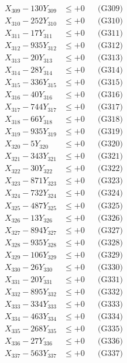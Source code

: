 \documentclass[a4paper,10pt]{article}
\begin{document}
{\begin{align}
X_{309} - 130Y_{309} &\leq +0 && \text{(G309)} \\
X_{310} - 252Y_{310} &\leq +0 && \text{(G310)} \\
\allowbreak
X_{311} - 17Y_{311} &\leq +0 && \text{(G311)} \\
X_{312} - 935Y_{312} &\leq +0 && \text{(G312)} \\
X_{313} - 20Y_{313} &\leq +0 && \text{(G313)} \\
X_{314} - 28Y_{314} &\leq +0 && \text{(G314)} \\
X_{315} - 336Y_{315} &\leq +0 && \text{(G315)} \\
X_{316} - 40Y_{316} &\leq +0 && \text{(G316)} \\
X_{317} - 744Y_{317} &\leq +0 && \text{(G317)} \\
X_{318} - 66Y_{318} &\leq +0 && \text{(G318)} \\
X_{319} - 935Y_{319} &\leq +0 && \text{(G319)} \\
X_{320} - 5Y_{320} &\leq +0 && \text{(G320)} \\
\allowbreak
X_{321} - 343Y_{321} &\leq +0 && \text{(G321)} \\
X_{322} - 30Y_{322} &\leq +0 && \text{(G322)} \\
X_{323} - 871Y_{323} &\leq +0 && \text{(G323)} \\
X_{324} - 732Y_{324} &\leq +0 && \text{(G324)} \\
X_{325} - 487Y_{325} &\leq +0 && \text{(G325)} \\
X_{326} - 13Y_{326} &\leq +0 && \text{(G326)} \\
X_{327} - 894Y_{327} &\leq +0 && \text{(G327)} \\
X_{328} - 935Y_{328} &\leq +0 && \text{(G328)} \\
X_{329} - 106Y_{329} &\leq +0 && \text{(G329)} \\
X_{330} - 26Y_{330} &\leq +0 && \text{(G330)} \\
\allowbreak
X_{331} - 20Y_{331} &\leq +0 && \text{(G331)} \\
X_{332} - 895Y_{332} &\leq +0 && \text{(G332)} \\
X_{333} - 334Y_{333} &\leq +0 && \text{(G333)} \\
X_{334} - 463Y_{334} &\leq +0 && \text{(G334)} \\
X_{335} - 268Y_{335} &\leq +0 && \text{(G335)} \\
X_{336} - 27Y_{336} &\leq +0 && \text{(G336)} \\
X_{337} - 563Y_{337} &\leq +0 && \text{(G337)} \\

\end{align}}
\end{document}
